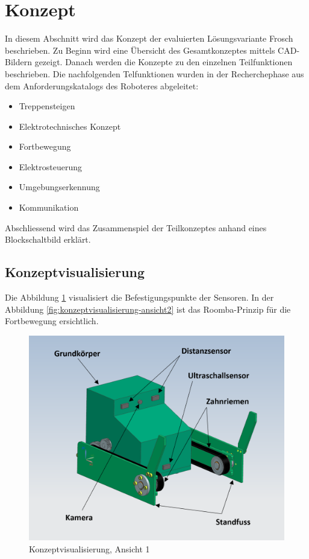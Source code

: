 \newpage

\section{Konzept}
In diesem Abschnitt wird das Konzept der evaluierten Lösungsvariante \glqq Frosch\grqq{} beschrieben. Zu Beginn wird eine Übersicht des Gesamtkonzeptes mittels CAD-Bildern gezeigt. Danach werden die Konzepte zu den einzelnen Teilfunktionen beschrieben. Die nachfolgenden Telfunktionen wurden in der Recherchephase aus dem Anforderungskatalogs des Roboteres abgeleitet:
\begin{itemize}
    \item Treppensteigen
    \item Elektrotechnisches Konzept
    \item Fortbewegung
    \item Elektrosteuerung
    \item Umgebungserkennung
    \item Kommunikation
\end{itemize}
Abschliessend wird das Zusammenspiel der Teilkonzeptes anhand eines Blockschaltbild erklärt.

\subsection{Konzeptvisualisierung}
Die Abbildung \ref{fig:konzeptvisualisierung-ansicht1} visualisiert die Befestigungspunkte der Sensoren. In der Abbildung \ref{fig:konzeptvisualisierung-ansicht2} ist das Roomba-Prinzip für die Fortbewegung ersichtlich.
\begin{figure}[H]
  \includegraphics[width=1\textwidth]{img/Treppensteigen/Geraetansicht_final.PNG}
  \centering
  \caption{Konzeptvisualisierung, Ansicht 1}
  \label{fig:konzeptvisualisierung-ansicht1}
\end{figure}

